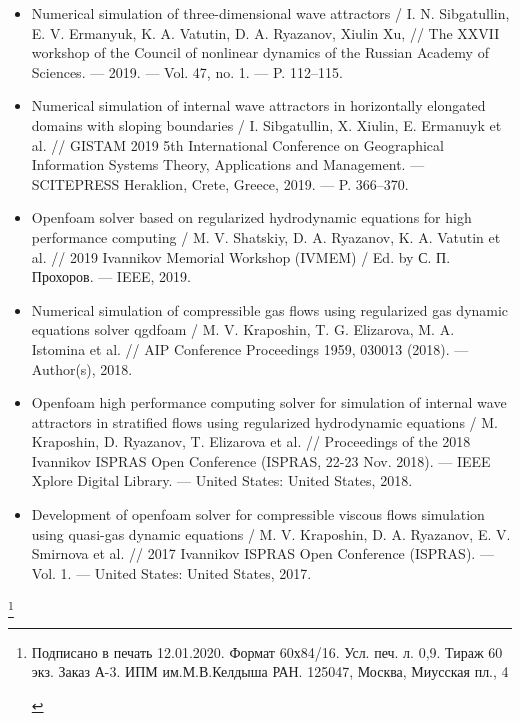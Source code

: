 \documentclass[utf8x]{G7-32} %
\newcommand\blfootnote[1]{%
  \begingroup
  \renewcommand\thefootnote{}\footnote{#1}%
  \addtocounter{footnote}{-1}%
  \endgroup
}
\begin{document}
\begin{itemize}

    \item Numerical simulation of three-dimensional wave attractors / I. N. Sibgatullin, E. V. Ermanyuk, K. A. Vatutin, D. A. Ryazanov, Xiulin Xu,  // The XXVII workshop of the Council of nonlinear dynamics of the Russian Academy of Sciences. — 2019. — Vol. 47, no. 1. — P. 112–115.
    
    \item Numerical simulation of internal wave attractors in horizontally elongated domains with sloping boundaries / I. Sibgatullin, X. Xiulin, E. Ermanuyk et al. // GISTAM 2019 5th International Conference on Geographical Information Systems Theory, Applications and Management. — SCITEPRESS Heraklion, Crete, Greece, 2019. — P. 366–370.
    
    \item Openfoam solver based on regularized hydrodynamic equations for high performance computing / M. V. Shatskiy, D. A. Ryazanov, K. A. Vatutin et al. // 2019 Ivannikov Memorial Workshop (IVMEM) / Ed. by С. П. Прохоров. — IEEE, 2019.
    
    \item Numerical simulation of compressible gas flows using regularized gas dynamic equations solver qgdfoam / M. V. Kraposhin, T. G. Elizarova, M. A. Istomina et al. // AIP Conference Proceedings 1959, 030013 (2018). — Author(s), 2018.
    
    \item Openfoam high performance computing solver for simulation of internal wave attractors in stratified flows using regularized hydrodynamic equations / M. Kraposhin, D. Ryazanov, T. Elizarova et al. // Proceedings of the 2018 Ivannikov ISPRAS Open Conference (ISPRAS, 22-23 Nov. 2018). — IEEE Xplore Digital Library. — United States: United States, 2018.
    
    \item Development of openfoam solver for compressible viscous flows simulation using quasi-gas dynamic equations / M. V. Kraposhin, D. A. Ryazanov, E. V. Smirnova et al. // 2017 Ivannikov ISPRAS Open Conference (ISPRAS). — Vol. 1. — United States: United States, 2017.
    
\end{itemize}





\blfootnote{
\begin{centering}
    Подписано в печать 12.01.2020. Формат 60х84/16.  Усл. печ. л. 0,9. Тираж 60 экз. Заказ А-3. ИПМ им.М.В.Келдыша РАН. 125047, Москва, Миусская пл., 4
\end{centering}
}
\end{document}
